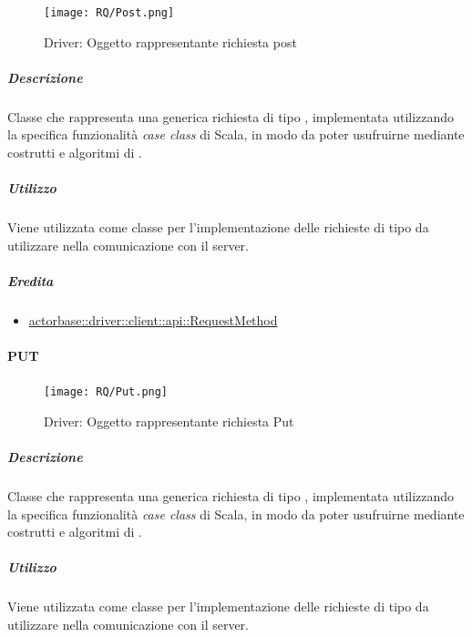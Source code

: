 \documentclass{scalatekids-article}
\begin{document}
\begin{figure}[H]
  \begin{center}
    \texttt{[image: RQ/Post.png]}
    \caption{Driver: Oggetto rappresentante richiesta post}
  \end{center}
\end{figure}

\subparagraph{Descrizione}

Classe che rappresenta una generica richiesta  di tipo
, implementata utilizzando la specifica funzionalità \textit{case
  class} di Scala, in modo da poter usufruirne mediante costrutti e algoritmi di
.

\subparagraph{Utilizzo}

Viene utilizzata come classe per l'implementazione delle richieste 
di tipo  da utilizzare nella comunicazione con il server.

\subparagraph{Eredita}

\begin{itemize}
\item \hyperref[sec:actorbase::driver::client::api::RequestMethod]{actorbase::driver::client::api::RequestMethod}
\end{itemize}


\paragraph{PUT}
\label{sec:actorbase::driver::client::api::PUT}

\begin{figure}[H]
  \begin{center}
    \texttt{[image: RQ/Put.png]}
    \caption{Driver: Oggetto rappresentante richiesta Put}
  \end{center}
\end{figure}

\subparagraph{Descrizione}

Classe che rappresenta una generica richiesta  di tipo
, implementata utilizzando la specifica funzionalità \textit{case
  class} di Scala, in modo da poter usufruirne mediante costrutti e algoritmi di
.

\subparagraph{Utilizzo}

Viene utilizzata come classe per l'implementazione delle richieste 
di tipo  da utilizzare nella comunicazione con il server.
\end{document}
